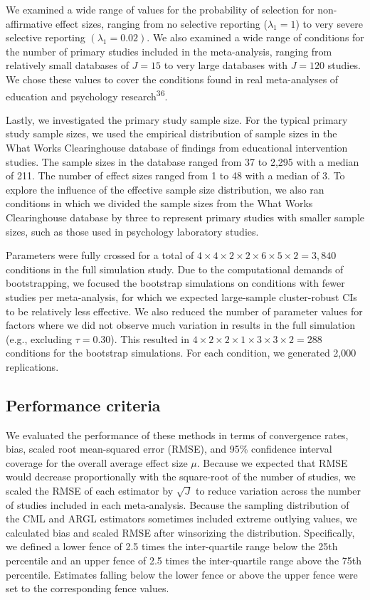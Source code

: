 \documentclass[
  american,
  man, donotrepeattitle,floatsintext]{apa7}
\begin{document}
We examined a wide range of values for the probability of selection for non-affirmative effect sizes, ranging from no selective reporting (\(\lambda_1 = 1\)) to very severe selective reporting \((\lambda_1 = 0.02)\).
We also examined a wide range of conditions for the number of primary studies included in the meta-analysis, ranging from relatively small databases of \(J = 15\) to very large databases with \(J = 120\) studies.
We chose these values to cover the conditions found in real meta-analyses of education and psychology research\textsuperscript{36}.

Lastly, we investigated the primary study sample size.
For the typical primary study sample sizes, we used the empirical distribution of sample sizes in the What Works Clearinghouse database of findings from educational intervention studies.
The sample sizes in the database ranged from 37 to 2,295 with a median of 211.
The number of effect sizes ranged from 1 to 48 with a median of 3.
To explore the influence of the effective sample size distribution, we also ran conditions in which we divided the sample
sizes from the What Works Clearinghouse database by three to represent primary studies with smaller sample sizes,
such as those used in psychology laboratory studies.

Parameters were fully crossed for a total of \(4 \times 4 \times 2 \times 2 \times 6 \times 5 \times 2 = 3,840\) conditions in the full simulation study.
Due to the computational demands of bootstrapping, we focused the bootstrap simulations on conditions with fewer studies per meta-analysis, for which we expected large-sample cluster-robust CIs to be relatively less effective.
We also reduced the number of parameter values for factors where we did
not observe much variation in results in the full simulation
(e.g., excluding \(\tau = 0.30\)).
This resulted in \(4 \times 2 \times 2 \times 1 \times 3 \times 3 \times 2 = 288\) conditions for the bootstrap simulations.
For each condition, we generated 2,000 replications.

\subsection{Performance criteria}\label{performance-criteria}

We evaluated the performance of these methods in terms of convergence rates, bias,
scaled root mean-squared error (RMSE), and 95\% confidence interval coverage for the overall average effect size \(\mu\).
Because we expected that RMSE would decrease proportionally with the square-root of the number of studies, we scaled the RMSE of each estimator by \(\sqrt{J}\) to reduce variation across the number of studies included in each meta-analysis.
Because the sampling distribution of the CML and ARGL estimators sometimes included extreme outlying values, we calculated bias and scaled RMSE after winsorizing the distribution.
Specifically, we defined a lower fence of 2.5 times the inter-quartile range below the 25th percentile and an upper fence of 2.5 times the inter-quartile range above the 75th percentile.
Estimates falling below the lower fence or above the upper fence were set to the corresponding fence values.
\end{document}

